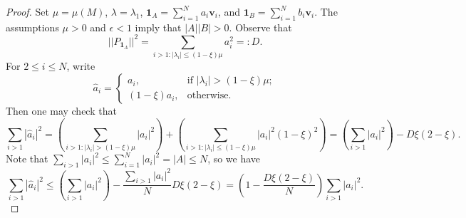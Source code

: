 \documentclass[11pt]{article}
\numberwithin{equation}{section}
\def\v{\mathbf{v}}
\def\1{\mathbf{1}}
\begin{document}
\begin{proof}
Set $\mu=\mu(M)$, $\lambda=\lambda_1$, $\1_A=\sum_{i=1}^N a_i\v_i$, and $\1_B=\sum_{i=1}^N b_i\v_i$.
The assumptions $\mu>0$ and $\epsilon<1$ imply that $|A||B|>0$.
Observe that
$$ ||P_{\1_A}||^2=\sum_{i>1: |\lambda_i|\leq (1-\xi)\mu } a_i^2=:D.$$
For $2\leq i\leq N$, write
$$\widehat{a}_i=
\left\{
\begin{array}{ll}
a_i, &  \mbox{if~} |\lambda_i|>(1-\xi) \mu ;\\
(1-\xi)a_i, & \mbox{otherwise}.
\end{array}\right.$$
Then one may check that
$$\sum_{ i>1} |\widehat{a}_i|^2=
\left(\sum_{ i>1: |\lambda_i|>(1-\xi) \mu  }  |a_i|^2\right)+
\left(\sum_{ i>1: |\lambda_i|\leq(1-\xi) \mu  }  |a_i|^2 (1-\xi)^2\right)
=\left(\sum_{ i>1}|a_i|^2\right) - D \xi(2-\xi).$$
Note that $\sum_{ i>1}|a_i|^2 \leq \sum_{ i=1}^N|a_i|^2=|A|\leq N$,
so we have
\begin{equation}\label{Hfmanstabilityeq111}
\sum_{ i>1} |\widehat{a}_i|^2\leq \left(\sum_{ i>1}|a_i|^2\right) - \frac{\sum_{ i>1}|a_i|^2}{N} D \xi(2-\xi)=
\left(1-\frac{D \xi(2-\xi)}{N}\right)\sum_{ i>1}|a_i|^2.
\end{equation}



\end{proof}
\end{document}
